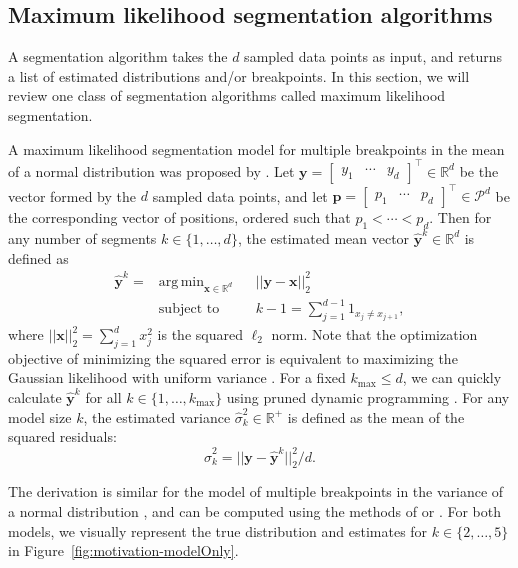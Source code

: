 \documentclass{jsfds} %
\DeclareMathOperator*{\argmin}{arg\,min}
\newcommand{\RR}{\mathbb{R}}
\begin{document}
\subsection{Maximum likelihood segmentation algorithms}
\label{sec:max-lik}

A segmentation algorithm takes the $d$ sampled data points as input,
and returns a list of estimated distributions and/or breakpoints. In
this section, we will review one class of segmentation algorithms
called maximum likelihood segmentation.

A maximum likelihood segmentation model for multiple breakpoints in
the mean of a normal distribution was proposed by
\citet{statistical-approach}. Let $\mathbf y = \left[
  \begin{array}{ccc}
    y_1 & \cdots & y_d
  \end{array}
\right]^\intercal \in \RR^d$ be the vector formed by the $d$
sampled data points, and let  $\mathbf p = \left[
  \begin{array}{ccc}
    p_1 & \cdots & p_d
  \end{array}
\right]^\intercal \in \mathcal P^d$ be the corresponding vector of
positions, ordered such that $p_1 < \cdots < p_d$. Then for any number
of segments $k\in\{1, \dots, d\}$, the estimated mean vector $\mathbf{\hat
  y}^k\in\RR^d$ is defined as
\begin{equation}
\label{eq:yhat^k}
\begin{aligned}
\mathbf{\hat  y}^k = &\argmin_{\mathbf x \in \RR^d} &&  ||\mathbf y - \mathbf x||^2_2
\\
&\text{subject to} && k-1=\sum_{j=1}^{d-1} 1_{x_j\neq x_{j+1}},
\end{aligned}
\end{equation}
where $||\mathbf x||^2_2=\sum_{j=1}^d x_j^2$ is the squared $\ell_2$
norm. Note that the optimization objective of minimizing the squared
error is equivalent to maximizing the Gaussian likelihood with uniform
variance \citep{statistical-approach}. For a fixed $k_{\text{max}}\leq
d$, we can quickly calculate $\mathbf{\hat y}^k$ for all
$k\in\{1,\dots,k_{\text{max}}\}$ using pruned dynamic programming
\citep{pruned-dp}. For any model size $k$, the estimated variance
$\hat \sigma^2_k\in\RR^+$ is defined as the mean of the squared
residuals:
\begin{equation}
  \label{eq:sigmahat}
  \hat \sigma_k^2 = ||\mathbf y - \mathbf{\hat y}^k||^2_2/d.
\end{equation}

The derivation is similar for the model of multiple breakpoints in the
variance of a normal distribution \citep{lavielle2005}, and can be
computed using the methods of \citet{pelt} or \citet{segmentor}. For
both models, we visually represent the true distribution and estimates
for $k\in\{2, \dots, 5\}$ in Figure~\ref{fig:motivation-modelOnly}.
\end{document}
